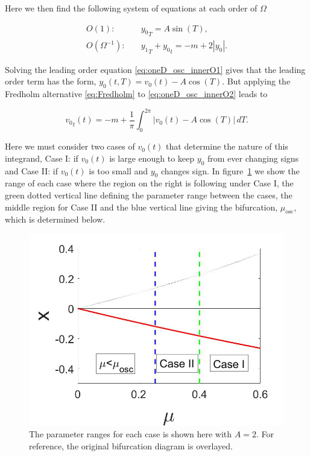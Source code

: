 Here we then find the following system of equations at each order of $\Omega$

\begin{align}
\label{eq:oneD_osc_innerO1}
O(1):\quad & {y_0}_T = A\sin(T),\\
\label{eq:oneD_osc_innerO2}
O(\Omega^{-1}):\quad & {y_1}_T+{y_0}_t = -m+2|y_0|.
\end{align}

Solving the leading order equation \eqref{eq:oneD_osc_innerO1} gives that the leading order term has the form, $y_0(t,T)=v_0(t)-A\cos(T)$. But applying the Fredholm alternative \eqref{eq:Fredholm} to \eqref{eq:oneD_osc_innerO2} leads to

\begin{equation}\label{eq:oneD_osc_integral}
{v_0}_t(t)=-m+\frac{1}{\pi}\int_0^{2\pi} |v_0(t)-A\cos(T)|\,dT.
\end{equation}

Here we must consider two cases of $v_0(t)$ that determine the nature of this integrand, Case I: if $v_0(t)$ is large enough to keep $y_0$ from ever changing signs and Case II: if $v_0(t)$ is too small and $y_0$ changes sign. In figure~\ref{fig:oneD_osc_cases} we show the range of each case where the region on the right is following under Case I, the green dotted vertical line defining the parameter range between the cases, the middle region for Case II and the blue vertical line giving the bifurcation, $\mu_{\text{osc}}$, which is determined below.

\begin{figure}[H]
\centering
\includegraphics[width=.7\textwidth]{oneD/osc_cases.jpg}
\caption{The parameter ranges for each case is shown here with $A=2$. For reference, the original bifurcation diagram is overlayed.}
\label{fig:oneD_osc_cases}
\end{figure}

